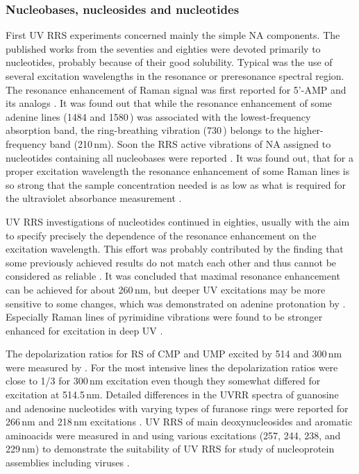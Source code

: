 \subsubsection{Nucleobases, nucleosides and nucleotides}

First UV RRS experiments concerned mainly the simple NA components.
The published works from the seventies and eighties were devoted primarily to
nucleotides, probably because of their good solubility.
Typical was the use of several excitation wavelengths in the resonance or
preresonance spectral region.
The resonance enhancement of Raman signal was first reported for 5'-AMP and its
analogs
\parencite{%
	Tsuboi1974,%
	Pezolet1975,%
	Blazej1977%
}.
It was found out that while the resonance enhancement of some adenine lines
(1484 and 1580\,\icm{}) was associated with the lowest-frequency absorption
band, the ring-breathing vibration (730\,\icm{}) belongs to the
higher-frequency band (210\,nm).
Soon the RRS active vibrations of NA assigned to nucleotides containing all
nucleobases were reported
\parencite{%
	Chinsky1978,%
	Nishimura1977%
}.
It was found out, that for a proper excitation wavelength the resonance
enhancement of some Raman lines is so strong that the sample concentration
needed is as low as what is required for the ultraviolet absorbance measurement
\parencite{Nishimura1977}.

UV RRS investigations of nucleotides continued in eighties, usually with the
aim to specify precisely the dependence of the resonance enhancement on the
excitation wavelength.
This effort was probably contributed by the finding that some previously
achieved results do not match each other and thus cannot be considered as
reliable
\parencite{Bushaw1980}.
It was concluded that maximal resonance enhancement can be achieved for about
260\,nm, but deeper UV excitations may be more sensitive to some changes,
which was demonstrated on adenine protonation by
\textcite{Kubasek1985}.
Especially Raman lines of pyrimidine vibrations were found to be stronger
enhanced for excitation in deep UV
\parencite{%
	Ziegler1984,%
	Fodor1985%
}.

The depolarization ratios for RS of CMP and UMP excited by 514 and 300\,nm were
measured by
\textcite{Blazej1980}.
For the most intensive lines the depolarization ratios were close to 1/3 for
300\,nm excitation even though they somewhat differed for excitation at
514.5\,nm.
Detailed differences in the UVRR spectra of guanosine and adenosine nucleotides
with varying types of furanose rings were reported for 266\,nm and 218\,nm
excitations
\parencite{Nishimura1987}.
UV RRS of main deoxynucleosides and aromatic aminoacids were measured in
 and  using various excitations (257, 244, 238, and 229\,nm) to
demonstrate the suitability of UV RRS for study of nucleoprotein assemblies
including viruses
\parencite{Wen1998}.

